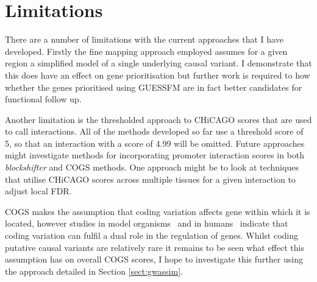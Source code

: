 \documentclass[a4paper,11pt]{report}
\begin{document}
\section{Limitations}
There are a number of limitations with the current approaches that I have developed. Firstly the fine mapping approach employed assumes for a given region a simplified model of a single underlying causal variant. I demonstrate that this does have an effect on gene prioritisation but further work is required to how whether the genes prioritised using GUESSFM are in fact better candidates for functional follow up.

Another limitation is the thresholded approach to CHiCAGO scores that are used to call interactions. All of the methods developed so far use a threshold score of 5, so that an interaction with a score of 4.99 will be omitted. Future approaches might investigate methods for incorporating promoter interaction scores in both \textit{blockshifter} and COGS methods. One approach might be to look at techniques that utilise CHiCAGO scores across multiple tissues for a given interaction to adjust local FDR. 

COGS makes the assumption that coding variation affects gene within which it is located, however studies in model organisms~\citep{LawrieMesserHershbergEtAl2013} and in humans~\citep{StergachisHaugenShaferEtAl2013} indicate that coding variation can fulfil a dual role in the regulation of genes. Whilst coding putative causal variants are relatively rare it remains to be seen what effect this assumption has on overall COGS scores, I hope to investigate this further using the approach detailed in Section \ref{sect:gwassim}.
\end{document}
